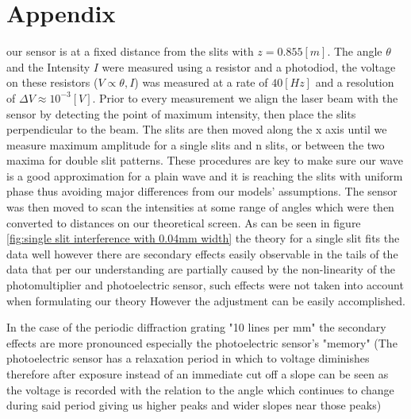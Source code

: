 \section{Appendix}
our sensor is at a fixed distance from the slits with $z=0.855 [m]$.
The angle $\theta$ and the Intensity $I$ were measured using a resistor and a photodiod, the voltage on these resistors ($V\propto\theta,I$) was
measured at a rate of $40[Hz]$ and a resolution of $\Delta V\approx10^{-3}[V]$.
Prior to every measurement we align the laser beam with the sensor by detecting the point of maximum intensity, then place the slits perpendicular to
the beam.
The slits are then moved along the x axis until we measure maximum amplitude for a single slits and n slits, or between the two maxima for double slit patterns.
These procedures are key to make sure our wave is a good approximation for a plain wave and it is reaching the slits with uniform phase thus avoiding major differences from our models' assumptions.
The sensor was then moved to scan the intensities at some range of angles which were then converted to distances on our theoretical screen.
As can be seen in figure \ref{fig:single slit interference with 0.04mm width} the theory for a single slit fits the data well however there are
secondary effects easily observable in the tails of the data that per our understanding are partially caused by the non-linearity of the
photomultiplier and photoelectric sensor, such effects were not taken into account when formulating our theory
However the adjustment can be easily accomplished.



In the case of the periodic diffraction grating "10 lines per mm" the secondary effects are more pronounced especially
the photoelectric sensor's "memory" (The photoelectric sensor has a relaxation period in which to voltage diminishes
therefore after exposure instead of an immediate cut off a slope can be seen as the voltage is recorded with the relation
to the angle which continues to change during said period giving us higher peaks and wider slopes near those peaks)
